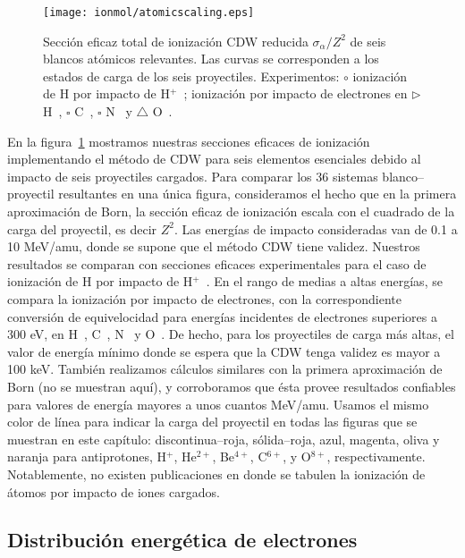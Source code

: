 \begin{figure}
\centering
\texttt{[image: ionmol/atomicscaling.eps]}
\caption[Sección eficaz total de ionización reducida de átomos relevantes.]
{Sección eficaz total de ionización CDW reducida $\sigma_{\alpha}/Z^2$ 
de seis blancos atómicos relevantes. Las curvas se corresponden a los 
estados de carga de los seis proyectiles. Experimentos: 
\mbox{\Large$\circ$} ionización de H por impacto de H$^+$~\cite{Shah:81};
ionización por impacto de electrones en $\rhd$ H~\cite{Shah:87}, 
$\square$ C~\cite{Brook:78}, $\square$ N~\cite{Brook:78} y 
$\triangle$ O~\cite{Thompson:95}.}
\label{fig:atomscaling}
\end{figure} 

En la figura~\ref{fig:atomscaling} mostramos nuestras secciones eficaces
de ionización implementando el método de CDW para seis elementos esenciales
debido al impacto de seis proyectiles cargados. Para comparar los 36
sistemas blanco--proyectil resultantes en una única figura, consideramos
el hecho que en la primera aproximación de Born, la sección eficaz de 
ionización escala con el cuadrado de la carga del proyectil, es decir
$Z^{2}$. Las energías de impacto consideradas van de 0.1 a 10 MeV/amu, 
donde se supone que el método CDW tiene validez. Nuestros resultados se
comparan con secciones eficaces experimentales para el caso de ionización 
de H por impacto de H$^+$~\cite{Shah:81}. En el rango de medias a altas
energías, se compara la ionización por impacto de electrones, con la 
correspondiente conversión de equivelocidad para energías incidentes de 
electrones superiores a 300 eV, en H~\cite{Shah:87}, C~\cite{Brook:78}, 
N~\cite{Brook:78} y O~\cite{Thompson:95}. De hecho, para los proyectiles 
de carga más altas, el valor de energía mínimo donde se espera que la CDW 
tenga validez es mayor a 100 keV. También realizamos cálculos similares 
con la primera aproximación de Born (no se muestran aquí), y corroboramos 
que ésta provee resultados confiables para valores de energía mayores a 
unos cuantos MeV/amu. Usamos el mismo color de línea para indicar la 
carga del proyectil en todas las figuras que se muestran en este 
capítulo: discontinua--roja, sólida--roja, azul, magenta, oliva y naranja 
para antiprotones, H$^{+}$, He$^{2+}$, Be$^{4+}$, C$^{6+}$, y O$^{8+}$, 
respectivamente. Notablemente, no existen publicaciones en donde se
tabulen la ionización de átomos por impacto de iones cargados.

\subsection{Distribución energética de electrones}
\label{subsec:meanener}

